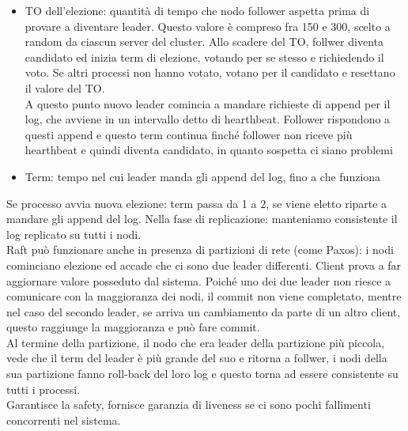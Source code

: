 \documentclass{article}
\begin{document}
\begin{itemize}
\item TO dell'elezione: quantità di tempo che nodo follower aspetta prima di provare a diventare leader. Questo valore è compreso fra 150 e 300, scelto a random da ciascun server del cluster. Allo scadere del TO, follwer diventa candidato ed inizia term di elezione, votando per se stesso e richiedendo il voto. Se altri processi non hanno votato, votano per il candidato e resettano il valore del TO.\\ A questo punto nuovo leader comincia a mandare richieste di append per il log, che avviene in un intervallo detto di hearthbeat. Follower rispondono a questi append e questo term continua finché follower non riceve più hearthbeat e quindi diventa candidato, in quanto sospetta ci siano problemi
\item Term: tempo nel cui leader manda gli append del log, fino a che funziona
\end{itemize}
Se processo avvia nuova elezione: term passa da 1 a 2, se viene eletto riparte a mandare gli append del log. Nella fase di replicazione: manteniamo consistente il log replicato su tutti i nodi.\\ Raft può funzionare anche in presenza di partizioni di rete (come Paxos): i nodi cominciano elezione ed accade che ci sono due leader differenti. Client prova a far aggiornare valore posseduto dal sistema. Poiché uno dei due leader non riesce a comunicare con la maggioranza dei nodi, il commit non viene completato, mentre nel caso del secondo leader, se arriva un cambiamento da parte di un altro client, questo raggiunge la maggioranza e può fare commit.\\ Al termine della partizione, il nodo che era leader della partizione più piccola, vede che il term del leader è più grande del suo e ritorna a follwer, i nodi della sua partizione fanno roll-back del loro log e questo torna ad essere consistente su tutti i processi.\\ Garantisce la safety, fornisce garanzia di liveness se ci sono pochi fallimenti concorrenti nel sistema.
\end{document}
